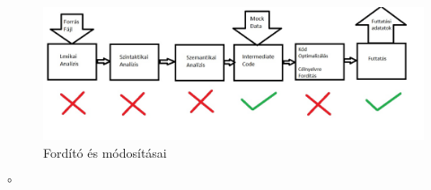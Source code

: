 \begin{figure}[h]
\centering
\includegraphics[scale=0.4]{images/Compiler.jpg}
\caption{Fordító és módosításai}
\label{fig:compiler}
\end{figure}



°%









